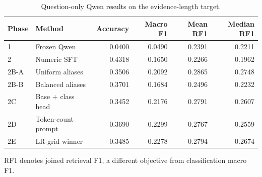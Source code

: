 \begin{table}[htbp]
\centering\small
\caption{Question-only Qwen results on the evidence-length target.}
\label{tab:qwen_results}
\begin{tabular}{@{}llrrrr@{}}
\toprule
Phase & Method & Accuracy & Macro F1 & Mean RF1 & Median RF1\\
\midrule
1 & Frozen Qwen & 0.0400 & 0.0490 & 0.2391 & 0.2211\\
2 & Numeric SFT & 0.4318 & 0.1650 & 0.2266 & 0.1962\\
2B-A & Uniform aliases & 0.3506 & 0.2092 & 0.2865 & 0.2748\\
2B-B & Balanced aliases & 0.3701 & 0.1684 & 0.2496 & 0.2232\\
2C & Base + class head & 0.3452 & 0.2176 & 0.2791 & 0.2607\\
2D & Token-count prompt & 0.3690 & 0.2299 & 0.2767 & 0.2559\\
2E & LR-grid winner & 0.3485 & 0.2278 & 0.2794 & 0.2674\\
\bottomrule
\end{tabular}
\par\smallskip\begin{minipage}{\textwidth}\footnotesize RF1 denotes joined retrieval F1, a different objective from classification macro F1.\end{minipage}
\end{table}
